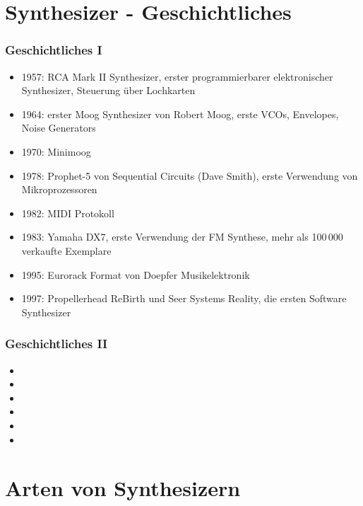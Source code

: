 \documentclass[11pt,ngerman]{beamer}
\begin{document}

 
\section{Synthesizer - Geschichtliches}

\begin{frame}
\frametitle{Geschichtliches I}


\begin{itemize}
\item 1957: RCA Mark II Synthesizer, erster programmierbarer elektronischer Synthesizer, Steuerung über Lochkarten 
\item 1964: erster Moog Synthesizer von Robert Moog, erste VCOs, Envelopes, Noise Generators
\item 1970: Minimoog
\item 1978: Prophet-5 von Sequential Circuits (Dave Smith), erste Verwendung von Mikroprozessoren
\item 1982: MIDI Protokoll
\item 1983: Yamaha DX7, erste Verwendung der FM Synthese, mehr als 100\,000 verkaufte Exemplare
\item 1995: Eurorack Format von Doepfer Musikelektronik
\item 1997: Propellerhead ReBirth und Seer Systems Reality, \newline die ersten Software Synthesizer
\end{itemize}
\end{frame} 
 
\begin{frame}
\frametitle{Geschichtliches II}


\begin{itemize}
\item 
\item 
\item 
\item 
\item 
\item 
\end{itemize}
\end{frame}
 
 
\section{Arten von Synthesizern}
 
\end{document}
